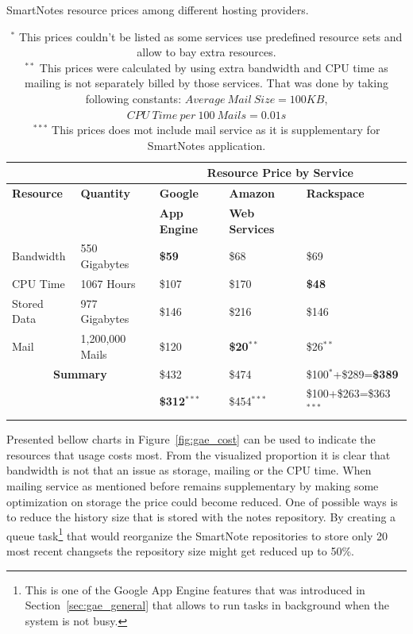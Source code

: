 \begin{table}[h]
\centering
\caption{SmartNotes resource prices among different hosting providers.}
\caption*{ $^{*}$ This prices couldn't be listed as some services use predefined resource sets and allow to bay extra resources.\\
 $^{**}$ This prices were calculated by using extra bandwidth and CPU time as mailing is not separately billed by those services. That was done by taking following constants: $Average\ Mail\ Size = 100KB$, $CPU\ Time\ per\ 100\ Mails = 0.01s$\\
 $^{***}$ This prices does mot include mail service as it is supplementary for SmartNotes application.}
\label{tab:services_price_compare}
\begin{tabular}{|l|l|l|l|l|} \cline{3-5}
		  \multicolumn{2}{c|}{}       &\multicolumn{3}{c|}{\textbf{Resource Price by Service}} \\ \hline \hline
\textbf{Resource} &\textbf{Quantity} &\textbf{Google}        &\textbf{Amazon}         &\textbf{Rackspace} \\ 
			     &			   &\textbf{App Engine} &\textbf{Web Services} &  \\ \hline \hline
Bandwidth &550 Gigabytes &\textbf{\$59} &\$68 &\$69 \\ \hline
CPU Time &1067 Hours &\$107 &\$170 &\textbf{\$48}\\ \hline
Stored Data &977 Gigabytes &\$146 & \$216 &\$146 \\ \hline
Mail &1,200,000 Mails &\$120 &\textbf{\$20}$^{**}$ &\$26$^{**}$ \\ \hline \hline
\multicolumn{2}{|c|}{\textbf{Summary}} &\$432 &\$474 &\$100$^{*}$+\$289=\textbf{\$389}\\ 
\multicolumn{2}{|c|}{} &\textbf{\$312}$^{***}$ &\$454$^{***}$ &\$100+\$263=\$363$^{***}$\\ \hline \hline
\end{tabular}
\end{table}

Presented bellow charts in Figure~\ref{fig:gae_cost} can be used to indicate the resources that usage costs most. From the visualized proportion it is clear that bandwidth is not that an issue as storage, mailing or the CPU time. When mailing service as mentioned before remains supplementary by making some optimization on storage the price could become reduced. One of possible ways is to reduce the history size that is stored with the notes repository. By creating a queue task\footnote{This is one of the Google App Engine features that was introduced in Section~\ref{sec:gae_general} that allows to run tasks in background when the system is not busy.} that would reorganize the SmartNote repositories to store only 20 most recent changsets the repository size might get reduced up to 50\%.      

